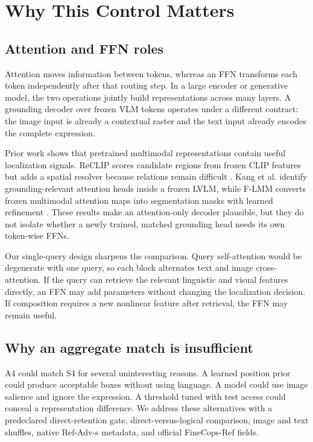 \documentclass[conference]{IEEEtran}
\begin{document}
\section{Why This Control Matters}
\subsection{Attention and FFN roles}
Attention moves information between tokens, whereas an FFN transforms each token independently after that routing step. In a large encoder or generative model, the two operations jointly build representations across many layers. A grounding decoder over frozen VLM tokens operates under a different contract: the image input is already a contextual raster and the text input already encodes the complete expression.

Prior work shows that pretrained multimodal representations contain useful localization signals. ReCLIP scores candidate regions from frozen CLIP features but adds a spatial resolver because relations remain difficult \cite{subramanian2022reclip}. Kang et al. identify grounding-relevant attention heads inside a frozen LVLM, while F-LMM converts frozen multimodal attention maps into segmentation masks with learned refinement \cite{kang2025heads,wu2025flmm}. These results make an attention-only decoder plausible, but they do not isolate whether a newly trained, matched grounding head needs its own token-wise FFNs.

Our single-query design sharpens the comparison. Query self-attention would be degenerate with one query, so each block alternates text and image cross-attention. If the query can retrieve the relevant linguistic and visual features directly, an FFN may add parameters without changing the localization decision. If composition requires a new nonlinear feature after retrieval, the FFN may remain useful.

\subsection{Why an aggregate match is insufficient}
A4 could match S4 for several uninteresting reasons. A learned position prior could produce acceptable boxes without using language. A model could use image salience and ignore the expression. A threshold tuned with test access could conceal a representation difference. We address these alternatives with a predeclared direct-retention gate, direct-versus-logical comparison, image and text shuffles, native Ref-Adv-s metadata, and official FineCops-Ref fields.
\end{document}
